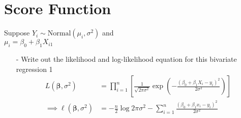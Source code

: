 \documentclass[letterpaper,12pt]{article}
\numberwithin{equation}{section}
\numberwithin{equation}{section}
\newcommand{\solutions}{1}
\begin{document}
\section{Score Function}

Suppose $Y_{i} \sim \text{Normal}(\mu_{i}, \sigma^2)$ and \\
$\mu_{i} = \beta_{0} + \beta_{1} X_{i1} $

\begin{itemize}
\item[-] Write out the likelihood and log-likelihood equation for this bivariate regression
\if \solutions1
{\color{red}
\begin{align*}
  L(\bm \beta, \sigma^2)
  &= \prod_{i=1}^n \left[ \frac{1}{\sqrt{2 \pi \sigma^2}} \exp\left(- \frac{(\beta_0 + \beta_1 X_i - y_i)^2}{2 \sigma^2} \right) \right]
  \\
  \implies \ell(\bm \beta, \sigma^2)
  &=  -\frac{n}{2}\log 2\pi \sigma^2 - \sum_{i=1}^n \frac{(\beta_0 + \beta_1 x_i - y_i)^2}{2 \sigma^2}
\end{align*}
}
\fi


\end{itemize}
\end{document}
